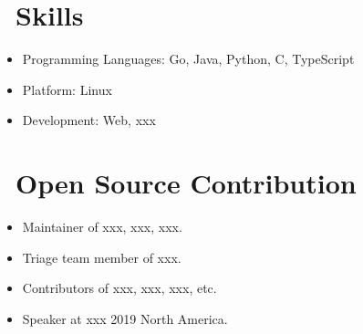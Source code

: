 \documentclass{resume}
\begin{document}
\section{\faCogs\ Skills}
\begin{itemize}[parsep=0.5ex]
  \item Programming Languages: Go, Java, Python, C, TypeScript
  \item Platform: Linux
  \item Development: Web, xxx
\end{itemize}

\section{\faInfo\ Open Source Contribution}
\begin{itemize}[parsep=0.5ex]
  \item Maintainer of xxx, xxx, xxx.
  \item Triage team member of xxx.
  \item Contributors of xxx, xxx, xxx, etc.
  \item Speaker at xxx 2019 North America.
\end{itemize}
\end{document}
